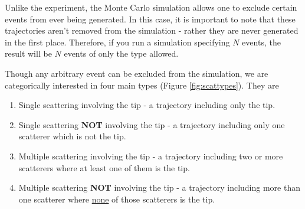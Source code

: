 Unlike the experiment, the Monte Carlo simulation allows one to exclude
certain events from ever being generated.  In this case, it is
important to note that these trajectories aren't removed from the
simulation - rather they are never generated in the first place.
Therefore, if you run a simulation specifying $N$ events, the result will
be $N$ events of only the type allowed.  

Though any arbitrary event can be excluded from the simulation, we are
categorically interested in four main types (Figure \ref{fig:scattypes}).
They are
\begin{enumerate}[I]
\item Single scattering involving the tip - a trajectory including only the
tip.
\item Single scattering {\bf NOT} involving the tip - a trajectory including only
one scatterer which is not the tip.
\item Multiple scattering involving the tip - a trajectory including two or
more scatterers where at least one of them is the tip.
\item Multiple scattering {\bf NOT} involving the tip - a trajectory including
more than one scatterer where \underline{none} of those scatterers is the tip.
\end{enumerate}
